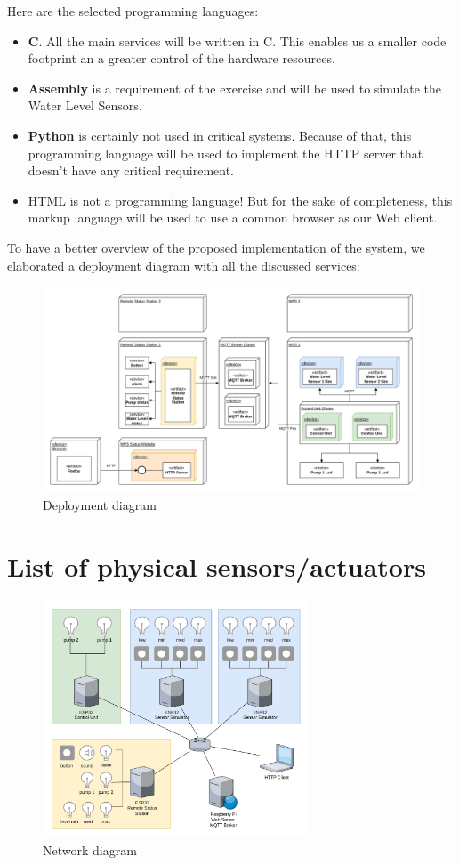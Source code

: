 \documentclass[11pt]{article}
\begin{document}
Here are the selected programming languages:

\begin{itemize}
	\item \textbf{C}. All the main services will be written in C. This enables us a smaller code footprint an a greater control of the hardware resources.
	\item \textbf{Assembly} is a requirement of the exercise and will be used to simulate the Water Level Sensors.
	\item \textbf{Python} is certainly not used in critical systems. Because of that, this programming language will be used to implement the HTTP server that doesn't have any critical requirement.
	\item HTML is not a programming language! But for the sake of completeness, this markup language will be used to use a common browser as our Web client.
\end{itemize}

To have a better overview of the proposed implementation of the system, we elaborated a deployment diagram with all the discussed services:

\begin{figure}[H]
  \centering
  \includegraphics[width=\linewidth]{../diagrams/deployment-diagram-WPS.jpg}
  \caption{Deployment diagram}
  \label{fig:Deployment Diagram}
\end{figure}

\newpage
\section{List of physical sensors/actuators}

\begin{figure}[H]
  \centering
  \includegraphics[width=300px]{../diagrams/network-diagram-WPS.jpg}
  \caption{Network diagram}
  \label{fig:Network1 Diagram}
\end{figure}
\end{document}
